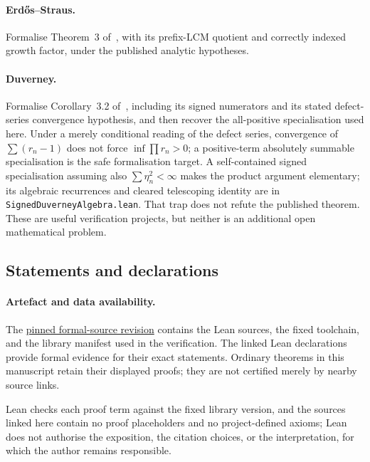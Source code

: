 \documentclass[11pt]{article}
\begin{document}
\paragraph{Erd\H{o}s--Straus.}
Formalise Theorem~3 of~\cite{erdosstraus1964}, with its prefix-LCM quotient
and correctly indexed growth factor, under the published analytic hypotheses.

\paragraph{Duverney.}
Formalise Corollary~3.2 of~\cite{duverney2001}, including its signed
numerators and its stated defect-series convergence hypothesis, and then
recover the all-positive specialisation used here.  Under a merely conditional reading of
the defect series, convergence of $\sum(r_n-1)$ does not force
$\inf\prod r_n>0$; a positive-term absolutely summable specialisation is the
safe formalisation target.  A self-contained signed specialisation assuming
also $\sum\eta_n^2<\infty$ makes the product argument elementary; its algebraic
recurrences and cleared telescoping identity are in
\texttt{SignedDuverneyAlgebra.lean}.  That trap does not refute the published
theorem.  These are useful verification projects, but neither is an additional
open mathematical problem.

\subsection*{Statements and declarations}

\paragraph{Artefact and data availability.} The
\href{\sourceurl}{pinned formal-source revision} contains the Lean sources, the
fixed toolchain, and the library manifest used in the verification.  The linked Lean declarations provide formal evidence for their exact
statements.  Ordinary theorems in this manuscript retain their displayed
proofs; they are not certified merely by nearby source links.

Lean checks each proof term against the fixed library
version, and the sources linked here contain no proof placeholders and no
project-defined axioms; Lean does not authorise the exposition, the citation
choices, or the interpretation, for which the author remains responsible.
\end{document}
